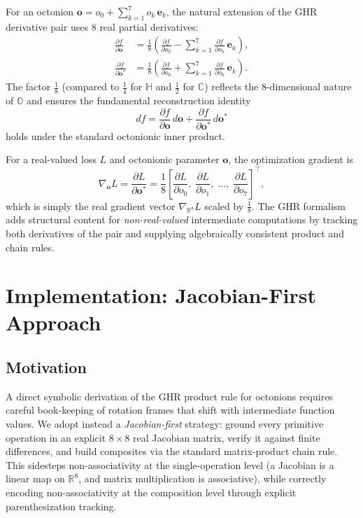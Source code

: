 \documentclass[11pt]{article}
\newcommand{\OO}{\mathbb{O}}
\newcommand{\HH}{\mathbb{H}}
\newcommand{\CC}{\mathbb{C}}
\newcommand{\RR}{\mathbb{R}}
\newcommand{\ee}[1]{\mathbf{e}_{#1}}
\newcommand{\pd}[2]{\frac{\partial #1}{\partial #2}}
\begin{document}
For an octonion $\mathbf{o} = o_0 + \sum_{k=1}^{7} o_k\,\ee{k}$, the natural
extension of the GHR derivative pair uses 8 real partial derivatives:
\begin{align}
  \pd{f}{\mathbf{o}}
  &= \frac{1}{8}\!\left(
        \pd{f}{o_0} - \sum_{k=1}^{7}\pd{f}{o_k}\,\ee{k}
     \right),\label{eq:ghr-full}\\[4pt]
  \pd{f}{\mathbf{o}^*}
  &= \frac{1}{8}\!\left(
        \pd{f}{o_0} + \sum_{k=1}^{7}\pd{f}{o_k}\,\ee{k}
     \right).\label{eq:ghr-conj}
\end{align}
The factor $\tfrac{1}{8}$ (compared to $\tfrac{1}{4}$ for $\HH$ and
$\tfrac{1}{2}$ for $\CC$) reflects the 8-dimensional nature of $\OO$ and
ensures the fundamental reconstruction identity
\begin{equation}
  df = \pd{f}{\mathbf{o}}\,d\mathbf{o} + \pd{f}{\mathbf{o}^*}\,d\mathbf{o}^*
\end{equation}
holds under the standard octonionic inner product.

For a real-valued loss $L$ and octonionic parameter $\mathbf{o}$, the
optimization gradient is
\begin{equation}
  \nabla_{\mathbf{o}} L
  = \pd{L}{\mathbf{o}^*}
  = \frac{1}{8}\!\left[
      \pd{L}{o_0},\;
      \pd{L}{o_1},\;
      \ldots,\;
      \pd{L}{o_7}
    \right]^\top,
\end{equation}
which is simply the real gradient vector $\nabla_{\RR^8} L$ scaled by
$\tfrac{1}{8}$.  The GHR formalism adds structural content for
\emph{non-real-valued} intermediate computations by tracking both derivatives
of the pair and supplying algebraically consistent product and chain rules.

\section{Implementation: Jacobian-First Approach}

\subsection{Motivation}

A direct symbolic derivation of the GHR product rule for octonions requires
careful book-keeping of rotation frames that shift with intermediate function
values.  We adopt instead a \emph{Jacobian-first} strategy: ground every
primitive operation in an explicit $8 \times 8$ real Jacobian matrix, verify it
against finite differences, and build composites via the standard matrix-product
chain rule.  This sidesteps non-associativity at the single-operation level
(a Jacobian is a linear map on $\RR^8$, and matrix multiplication is
associative), while correctly encoding non-associativity at the composition
level through explicit parenthesization tracking.
\end{document}
